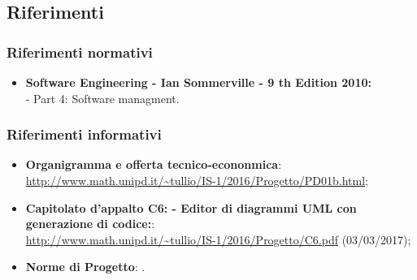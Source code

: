 \documentclass[../PianoDiProgetto.tex]{subfiles}
\begin{document}
		\subsection{Riferimenti}
			\subsubsection{Riferimenti normativi}
    			\begin{itemize}
    			\item \textbf{Software Engineering - Ian Sommerville - 9 th Edition 2010:} \\
    			- Part 4: Software managment. \\
			\end{itemize}
			\subsubsection{Riferimenti informativi}	
				\begin{itemize}
					\item \textbf{Organigramma e offerta tecnico-econonmica}:\\
					\url{http://www.math.unipd.it/~tullio/IS-1/2016/Progetto/PD01b.html};
					\item \textbf{Capitolato d'appalto C6: \progetto - Editor di diagrammi UML con 							generazione di codice:}:\\
					\url{http://www.math.unipd.it/~tullio/IS-1/2016/Progetto/C6.pdf} (03/03/2017);
					\item \textbf{Norme di Progetto}: \normediprogettov.
				\end{itemize}
\end{document}
